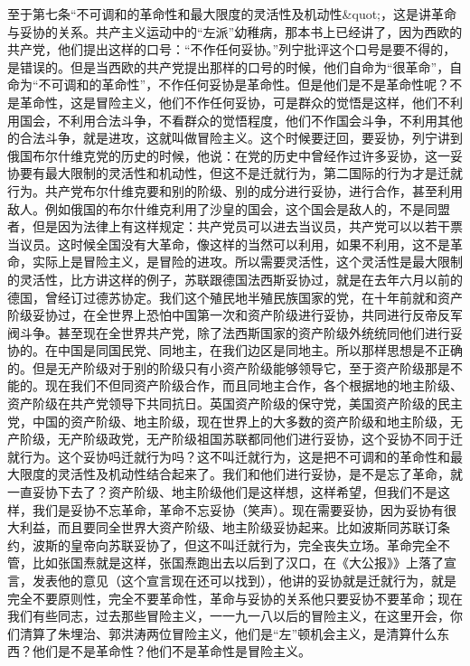 至于第七条“不可调和的革命性和最大限度的灵活性及机动性&quot;，这是讲革命与妥协的关系。共产主义运动中的“左派”幼稚病，那本书上已经讲了，因为西欧的共产党，他们提出这样的口号：“不作任何妥协。”列宁批评这个口号是要不得的，是错误的。但是当西欧的共产党提出那样的口号的时候，他们自命为“很革命”，自命为“不可调和的革命性”，不作任何妥协是革命性。但是他们是不是革命性呢？不是革命性，这是冒险主义，他们不作任何妥协，可是群众的觉悟是这样，他们不利用国会，不利用合法斗争，不看群众的觉悟程度，他们不作国会斗争，不利用其他的合法斗争，就是进攻，这就叫做冒险主义。这个时候要迂回，要妥协，列宁讲到俄国布尔什维克党的历史的时候，他说：在党的历史中曾经作过许多妥协，这一妥协要有最大限制的灵活性和机动性，但这不是迁就行为，第二国际的行为才是迁就行为。共产党布尔什维克要和别的阶级、别的成分进行妥协，进行合作，甚至利用敌人。例如俄国的布尔什维克利用了沙皇的国会，这个国会是敌人的，不是同盟者，但是因为法律上有这样规定：共产党员可以进去当议员，共产党可以以若干票当议员。这时候全国没有大革命，像这样的当然可以利用，如果不利用，这不是革命，实际上是冒险主义，是冒险的进攻。所以需要灵活性，这个灵活性是最大限制的灵活性，比方讲这样的例子，苏联跟德国法西斯妥协过，就是在去年六月以前的德国，曾经订过德苏协定。我们这个殖民地半殖民族国家的党，在十年前就和资产阶级妥协过，在全世界上恐怕中国第一次和资产阶级进行妥协，共同进行反帝反军阀斗争。甚至现在全世界共产党，除了法西斯国家的资产阶级外统统同他们进行妥协的。在中国是同国民党、同地主，在我们边区是同地主。所以那样思想是不正确的。但是无产阶级对于别的阶级只有小资产阶级能够领导它，至于资产阶级那是不能的。现在我们不但同资产阶级合作，而且同地主合作，各个根据地的地主阶级、资产阶级在共产党领导下共同抗日。英国资产阶级的保守党，美国资产阶级的民主党，中国的资产阶级、地主阶级，现在世界上的大多数的资产阶级和地主阶级，无产阶级，无产阶级政党，无产阶级祖国苏联都同他们进行妥协，这个妥协不同于迁就行为。这个妥协吗迁就行为吗？这不叫迁就行为，这是把不可调和的革命性和最大限度的灵活性及机动性结合起来了。我们和他们进行妥协，是不是忘了革命，就一直妥协下去了？资产阶级、地主阶级他们是这样想，这样希望，但我们不是这样，我们是妥协不忘革命，革命不忘妥协（笑声）。现在需要妥协，因为妥协有很大利益，而且要同全世界大资产阶级、地主阶级妥协起来。比如波斯同苏联订条约，波斯的皇帝向苏联妥协了，但这不叫迁就行为，完全丧失立场。革命完全不管，比如张国焘就是这样，张国焘跑出去以后到了汉口，在《大公报》》上落了宣言，发表他的意见（这个宣言现在还可以找到），他讲的妥协就是迁就行为，就是完全不要原则性，完全不要革命性，革命与妥协的关系他只要妥协不要革命；现在我们有些同志，过去那些冒险主义，一一九一八以后的冒险主义，在这里开会，你们清算了朱埋治、郭洪涛两位冒险主义，他们是“左”顿机会主义，是清算什么东西？他们是不是革命性？他们不是革命性是冒险主义。

